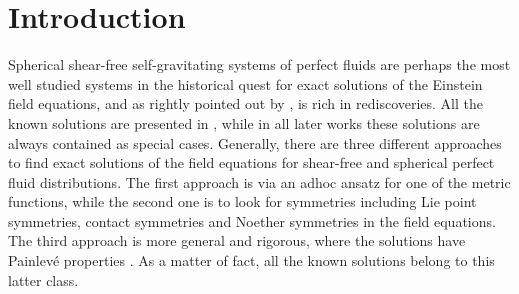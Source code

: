 \documentclass[abstract=on,notitlepage,superscriptaddress,nofootinbib,aps,showpacs,twocolumn,prd]{revtex4}
\newcommand{\0}{^{(0)}}
\newcommand{\1}{^{(1)}}
\newcommand{\2}{^{(2)}}
\newcommand{\3}{{}^{(3)}}
\begin{document}
\begin{abstract}
This is an important and natural question as the spacetime shear, inhomogeneity and tidal effects are all intertwined via the Einstein field equations. However, as we show in this paper, such scenarios are possible for limited classes of equations of state that are solutions to a highly non-linear and fourth order differential equation. To show this, we use a covariant semitetrad spacetime decomposition and present a novel geometrical classification of shear-free Locally Rotationally Symmetric (LRS-II) perfect fluid self-gravitating systems, in terms of the covariantly defined fluid acceleration and the fluid expansion. Noteworthily, we deduce the governing differential equation that gives the possible limited equations of state of matter. \\ 

 spacetime decomposition, shear-free fluids, equation of state
\end{abstract}



\maketitle


\section{Introduction}
 
Spherical shear-free self-gravitating systems of perfect fluids are perhaps the most well studied systems in the historical quest for exact solutions of the Einstein field equations, and as rightly pointed out by \cite{exact}, is rich in rediscoveries. All the known solutions are presented in \cite{McVittie, Kustaan, Wyman, wafo2}, while in all later works these solutions are always contained as special cases. Generally, there are three different approaches to find exact solutions of the field equations for shear-free and spherical perfect fluid distributions. The first approach is via an adhoc ansatz for one of the metric functions, while the second one is to look for symmetries including Lie point symmetries, contact symmetries and Noether symmetries in the field equations. The third approach is more general and rigorous, where the solutions have Painlev\'{e} properties \cite{Wyman}. As a matter of fact, all the known solutions belong to this latter class. 
\end{document}
